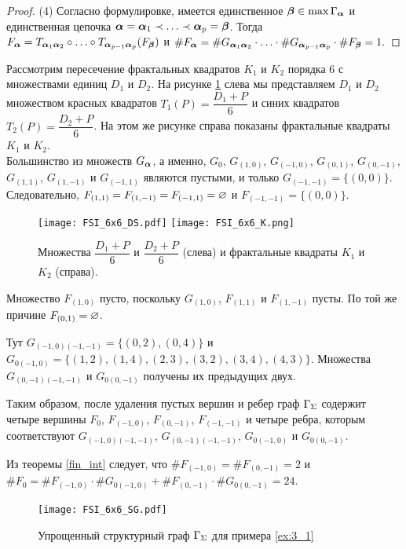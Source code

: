 \begin{proof}
(4) Согласно формулировке, имеется единственное ${\bm{\beta}}\in\max\Gamma_{\bm{\alpha}}$ и единственная цепочка ${\bm{\alpha}}={\bm{\alpha}}_1\prec\ldots\prec{\bm{\alpha}}_p={\bm{\beta}}$.
Тогда $F_{\bm{\alpha}}=T_{{\bm{\alpha}}_1{\bm{\alpha}}_2} \circ \ldots \circ  T_{{\bm{\alpha}}_{p-1}{\bm{\alpha}}_p} (F_{\bm{\beta}})$ и $\#F_{\bm{\alpha}}=\#G_{{\bm{\alpha}}_1{\bm{\alpha}}_2} \cdot \ldots \cdot  \#G_{{\bm{\alpha}}_{p-1}{\bm{\alpha}}_p}\cdot\#F_{\bm{\beta}}=1.$
\end{proof}


\begin{example} \label{ex:3_1}

\rm Рассмотрим пересечение фрактальных квадратов $K_1$ и $K_2$ порядка $6$ с множествами единиц $D_1$ и $D_2$.
На рисунке \ref{fig:FSI_6x6_DSK} слева мы представляем $D_1$ и $D_2$ множеством красных квадратов $T_1(P)=\dfrac{D_1+P}{6}$ и синих квадратов $T_2(P)=\dfrac{D_2+P}{6}$.
На этом же рисунке справа показаны фрактальные квадраты $K_1$ и $K_2$. \\

Большинство из множеств $G_{\bm{\alpha}}$, а именно, 
$G_0$, $G_{(1,0)}$, $G_{(-1,0)}$, $G_{(0,1)}$, $G_{(0,-1)}$, $G_{(1,1)}$, $G_{(1,-1)}$ и $G_{(-1,1)}$ являются пустыми, и только $G_{(-1,-1)}=\{(0,0)\}$. 
Следовательно, $F_{(1,1)}=F_{(1,-1)}=F_{(-1,1)}=\varnothing$ и $F_{(-1,-1)}=\{(0,0)\}$.

\begin{figure}[H]
    \texttt{[image: FSI\_6x6\_DS.pdf]}
    \hfill
    \texttt{[image: FSI\_6x6\_K.png]}
    \caption{Множества $\dfrac{D_1+P}{6}$ и $\dfrac{D_2+P}{6}$ (слева) и фрактальные квадраты $K_1$ и $K_2$ (справа).}
    \label{fig:FSI_6x6_DSK}
\end{figure}

Множество $F_{(1,0)}$ пусто, поскольку $G_{(1,0)}$, $F_{(1,1)}$ и $F_{(1,-1)}$ пусты. 
По той же причине $F_{(0,1)}=\varnothing$.

Тут $G_{(-1,0)(-1,-1)}=\{(0,2), (0,4)\}$ и $G_{0(-1,0)}=\{(1,2), (1,4),(2,3), (3,2), (3,4), (4,3)\}$.
Множества $G_{(0,-1)(-1,-1)}$ и $G_{0(0,-1)}$ получены их предыдущих двух.

Таким образом, после удаления пустых вершин и ребер
граф $\Gamma_\Sigma$ содержит четыре вершины  $F_0$, $F_{(-1,0)}$, $F_{(0,-1)}$, $F_{(-1,-1)}$ и четыре ребра, которым соответствуют $G_{(-1,0)(-1,-1)}$, $ G_{(0,-1)(-1,-1)}$, $G_{0(-1,0)}$ и $G_{0(0,-1)}$.

Из теоремы \eqref{fin_int} следует, что
$\#F_{(-1,0)}=\#F_{(0,-1)}=2$ и $\#F_0=\#F_{(-1,0)}\cdot\#G_{0(-1,0)}+\#F_{(0,-1)}\cdot\#G_{0(0,-1)}=24.$

\begin{figure}[H]
    \centering
    \texttt{[image: FSI\_6x6\_SG.pdf]}
    \caption{Упрощенный структурный граф $\Gamma_\Sigma$ для примера \ref{ex:3_1}}
\end{figure} 
\end{example} 




